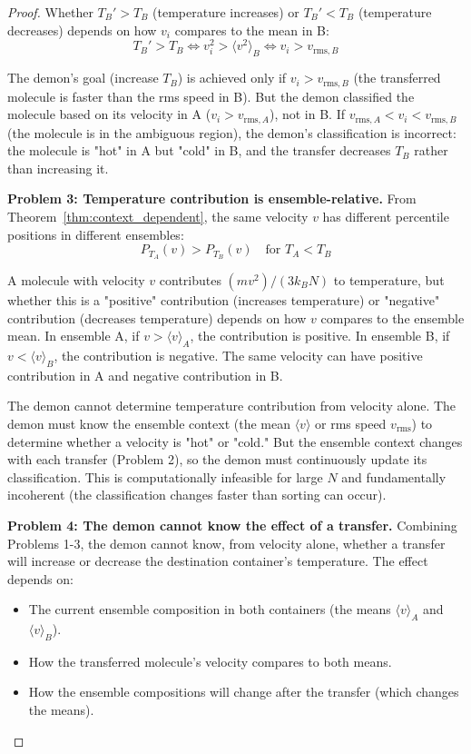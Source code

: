 \documentclass[12pt,a4paper]{article}
\theoremstyle{definition}
\theoremstyle{remark}
\begin{document}
\begin{proof}
Whether $T_B' > T_B$ (temperature increases) or $T_B' < T_B$ (temperature decreases) depends on how $v_i$ compares to the mean in B:
\begin{equation}
T_B' > T_B \iff v_i^2 > \langle v^2 \rangle_B \iff v_i > v_{\text{rms}, B}
\end{equation}

The demon's goal (increase $T_B$) is achieved only if $v_i > v_{\text{rms}, B}$ (the transferred molecule is faster than the rms speed in B). But the demon classified the molecule based on its velocity in A ($v_i > v_{\text{rms}, A}$), not in B. If $v_{\text{rms}, A} < v_i < v_{\text{rms}, B}$ (the molecule is in the ambiguous region), the demon's classification is incorrect: the molecule is "hot" in A but "cold" in B, and the transfer decreases $T_B$ rather than increasing it.

\textbf{Problem 3: Temperature contribution is ensemble-relative.}
From Theorem~\ref{thm:context_dependent}, the same velocity $v$ has different percentile positions in different ensembles:
\begin{equation}
P_{T_A}(v) > P_{T_B}(v) \quad \text{for } T_A < T_B
\end{equation}

A molecule with velocity $v$ contributes $(m v^2) / (3k_B N)$ to temperature, but whether this is a "positive" contribution (increases temperature) or "negative" contribution (decreases temperature) depends on how $v$ compares to the ensemble mean. In ensemble A, if $v > \langle v \rangle_A$, the contribution is positive. In ensemble B, if $v < \langle v \rangle_B$, the contribution is negative. The same velocity can have positive contribution in A and negative contribution in B.

The demon cannot determine temperature contribution from velocity alone. The demon must know the ensemble context (the mean $\langle v \rangle$ or rms speed $v_{\text{rms}}$) to determine whether a velocity is "hot" or "cold." But the ensemble context changes with each transfer (Problem 2), so the demon must continuously update its classification. This is computationally infeasible for large $N$ and fundamentally incoherent (the classification changes faster than sorting can occur).

\textbf{Problem 4: The demon cannot know the effect of a transfer.}
Combining Problems 1-3, the demon cannot know, from velocity alone, whether a transfer will increase or decrease the destination container's temperature. The effect depends on:
\begin{itemize}
    \item The current ensemble composition in both containers (the means $\langle v \rangle_A$ and $\langle v \rangle_B$).
    \item How the transferred molecule's velocity compares to both means.
    \item How the ensemble compositions will change after the transfer (which changes the means).
\end{itemize}


\end{proof}
\end{document}
